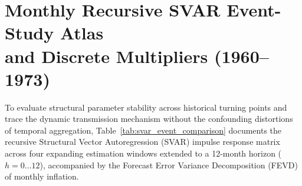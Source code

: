 \section[Monthly Recursive SVAR Event-Study Atlas (1960--1973)]{Monthly Recursive SVAR Event-Study Atlas\\and Discrete Multipliers (1960--1973)}
\label{app:annual_svar}
\label{app:recursive_svar}

To evaluate structural parameter stability across historical turning points and trace the dynamic transmission mechanism without the confounding distortions of temporal aggregation, Table~\ref{tab:svar_event_comparison} documents the recursive Structural Vector Autoregression (SVAR) impulse response matrix across four expanding estimation windows extended to a 12-month horizon ($h = 0 \dots 12$), accompanied by the Forecast Error Variance Decomposition (FEVD) of monthly inflation.


